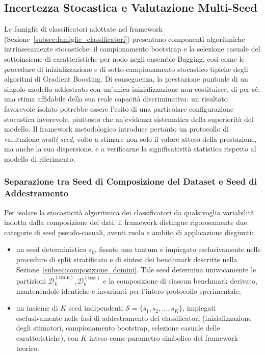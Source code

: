 \subsection{Incertezza Stocastica e Valutazione Multi-Seed}
\label{subsec:stabilita_stocastica}

Le famiglie di classificatori adottate nel framework (Sezione~\ref{subsec:famiglie_classificatori}) presentano componenti algoritmiche intrinsecamente stocastiche: il campionamento bootstrap e la selezione casuale del sottoinsieme di caratteristiche per nodo negli ensemble Bagging, così come le procedure di inizializzazione e di sotto-campionamento stocastico tipiche degli algoritmi di Gradient Boosting. Di conseguenza, la prestazione puntuale di un singolo modello addestrato con un'unica inizializzazione non costituisce, di per sé, una stima affidabile della sua reale capacità discriminativa: un risultato favorevole isolato potrebbe essere l'esito di una particolare configurazione stocastica favorevole, piuttosto che un'evidenza sistematica della superiorità del modello. Il framework metodologico introduce pertanto un protocollo di valutazione \textit{multi-seed}, volto a stimare non solo il valore atteso della prestazione, ma anche la sua dispersione, e a verificarne la significatività statistica rispetto al modello di riferimento.

\subsubsection{Separazione tra Seed di Composizione del Dataset e Seed di Addestramento}
\label{subsubsec:seed_separation}
Per isolare la stocasticità algoritmica dei classificatori da qualsivoglia variabilità indotta dalla composizione dei dati, il framework distingue rigorosamente due categorie di seed pseudo-casuali, aventi ruolo e ambito di applicazione disgiunti:
\begin{itemize}
    \item un seed deterministico $s_0$, fissato una tantum e impiegato esclusivamente nelle procedure di split stratificato e di sintesi dei benchmark descritte nella Sezione~\ref{subsec:composizione_domini}. Tale seed determina univocamente le partizioni $\mathcal{D}_k^{(\text{train})}, \mathcal{D}_k^{(\text{test})}$ e la composizione di ciascun benchmark derivato, mantenendole identiche e invarianti per l'intero protocollo sperimentale;
    \item un insieme di $K$ seed indipendenti $\mathcal{S} = \{s_1, s_2, \dots, s_K\}$, impiegati esclusivamente nelle fasi di addestramento dei classificatori (inizializzazione degli stimatori, campionamento bootstrap, selezione casuale delle caratteristiche), con $K$ inteso come parametro simbolico del framework teorico.
\end{itemize}

